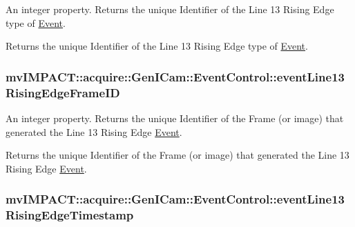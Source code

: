 An integer property. Returns the unique Identifier of the Line 13 Rising Edge type of \hyperlink{classmv_i_m_p_a_c_t_1_1acquire_1_1_event}{Event}. 

Returns the unique Identifier of the Line 13 Rising Edge type of \hyperlink{classmv_i_m_p_a_c_t_1_1acquire_1_1_event}{Event}. \hypertarget{classmv_i_m_p_a_c_t_1_1acquire_1_1_gen_i_cam_1_1_event_control_addb29007aca17045028c4915f2bdc147}{
\subsubsection[{event\+Line13\+Rising\+Edge\+Frame\+I\+D}]{ mv\+I\+M\+P\+A\+C\+T\+::acquire\+::\+Gen\+I\+Cam\+::\+Event\+Control\+::event\+Line13\+Rising\+Edge\+Frame\+I\+D}}\label{classmv_i_m_p_a_c_t_1_1acquire_1_1_gen_i_cam_1_1_event_control_addb29007aca17045028c4915f2bdc147}


An integer property. Returns the unique Identifier of the Frame (or image) that generated the Line 13 Rising Edge \hyperlink{classmv_i_m_p_a_c_t_1_1acquire_1_1_event}{Event}. 

Returns the unique Identifier of the Frame (or image) that generated the Line 13 Rising Edge \hyperlink{classmv_i_m_p_a_c_t_1_1acquire_1_1_event}{Event}. \hypertarget{classmv_i_m_p_a_c_t_1_1acquire_1_1_gen_i_cam_1_1_event_control_a4204be4e87008b8f3124b5245b14af3b}{
\subsubsection[{event\+Line13\+Rising\+Edge\+Timestamp}]{ mv\+I\+M\+P\+A\+C\+T\+::acquire\+::\+Gen\+I\+Cam\+::\+Event\+Control\+::event\+Line13\+Rising\+Edge\+Timestamp}}\label{classmv_i_m_p_a_c_t_1_1acquire_1_1_gen_i_cam_1_1_event_control_a4204be4e87008b8f3124b5245b14af3b}


